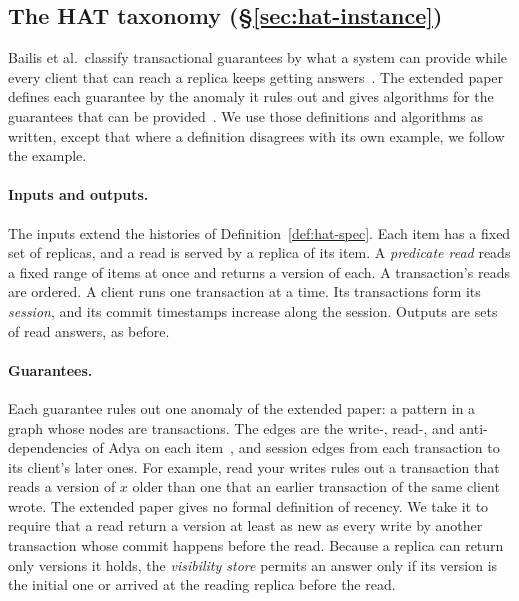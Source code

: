 \subsection{The HAT taxonomy (\S\ref{sec:hat-instance})}
\label{app:hat-taxonomy}

Bailis et al.\ classify transactional guarantees by what a system can provide
while every client that can reach a replica keeps getting
answers~\cite{bailis2013hat}.  The extended paper defines each guarantee by
the anomaly it rules out and gives algorithms for the guarantees that can be
provided~\cite{bailis2013hatextended}.  We use those definitions and
algorithms as written, except that where a definition disagrees with its own
example, we follow the example.

\paragraph{Inputs and outputs.}
The inputs extend the histories of Definition~\ref{def:hat-spec}.  Each item
has a fixed set of replicas, and a read is served by a replica of its item.  A
\emph{predicate read} reads a fixed range of items at once and returns a
version of each.  A transaction's reads are ordered.  A client runs one
transaction at a time.  Its transactions form its \emph{session}, and its
commit timestamps increase along the session.  Outputs are sets of read
answers, as before.

\paragraph{Guarantees.}
Each guarantee rules out one anomaly of the extended paper: a pattern in a
graph whose nodes are transactions.  The edges are the write-, read-, and
anti-dependencies of Adya on each item~\cite{adya1999weakconsistency}, and
session edges from each transaction to its client's later ones.  For example,
read your writes rules out a transaction that reads a version of $x$ older
than one that an earlier transaction of the same client wrote.  The extended
paper gives no formal definition of recency.  We take it to require that a
read return a version at least as new as every write by another transaction
whose commit happens before the read.  Because a replica can return only
versions it holds, the \emph{visibility store} permits an answer only if its
version is the initial one or arrived at the reading replica before the
read.

